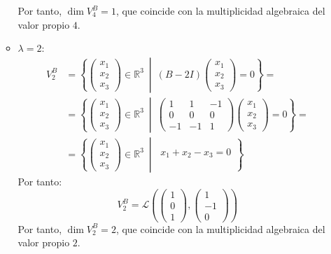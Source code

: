 \documentclass[12pt]{article}
\begin{document}
\begin{ejercicio}[2 puntos]
\begin{enumerate}
\begin{itemize}
			Por tanto, \(\dim V_4^B = 1\), que coincide con la multiplicidad algebraica del valor propio \( 4 \).
			
			\item \( \lambda = 2 \):
			\begin{align*}
				V_2^B &= \left\{
				\begin{pmatrix}
					x_1 \\
					x_2 \\
					x_3
				\end{pmatrix}
				\in \mathbb{R}^3 \ \middle| \ 
				(B - 2I)
				\begin{pmatrix}
					x_1 \\
					x_2 \\
					x_3
				\end{pmatrix}
				= 0
				\right\}
				=\\&= \left\{
				\begin{pmatrix}
					x_1 \\
					x_2 \\
					x_3
				\end{pmatrix}
				\in \mathbb{R}^3 \ \middle| \
				\begin{pmatrix}
					1 & 1 & -1 \\
					0 & 0 & 0 \\
					-1 & -1 & 1
				\end{pmatrix}
				\begin{pmatrix}
					x_1 \\
					x_2 \\
					x_3
				\end{pmatrix}
				= 0
				\right\}
				=\\&= \left\{
				\begin{pmatrix}
					x_1 \\
					x_2 \\
					x_3
				\end{pmatrix}
				\in \mathbb{R}^3 \ \middle| \
				\begin{array}{l}
					x_1 + x_2 - x_3 = 0 \\
				\end{array}
				\right\}
			\end{align*}
			Por tanto:
			\begin{equation*}
				V_2^B = \mathcal{L} \left(
				\begin{pmatrix}
					1 \\ 0 \\ 1
				\end{pmatrix},
				\begin{pmatrix}
					1 \\ -1 \\ 0
				\end{pmatrix}
				\right)
			\end{equation*}
			Por tanto, \(\dim V_2^B = 2\), que coincide con la multiplicidad algebraica del valor propio \( 2 \).
		\end{itemize}
	\end{enumerate}
		

\end{ejercicio}
\end{document}
